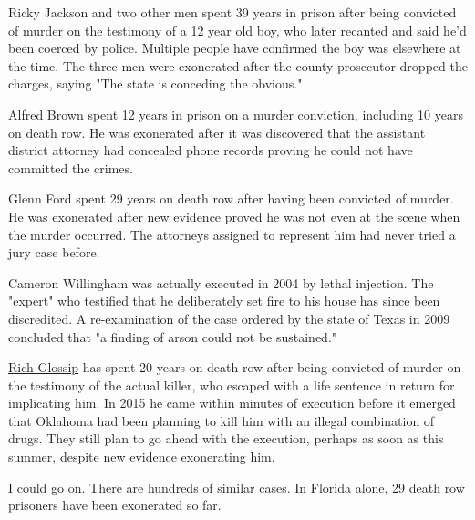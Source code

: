 Ricky
                  Jackson and two other men spent 39 years in prison after being
                  convicted of murder on the testimony of a 12 year old boy, who
                  later recanted and said he'd been coerced by police. Multiple
                  people have confirmed the boy was elsewhere at the time. The
                  three men were exonerated after the county prosecutor dropped
                  the charges, saying "The state is conceding the obvious."

Alfred
                  Brown spent 12 years in prison on a murder conviction,
                  including 10 years on death row. He was exonerated after it
                  was discovered that the assistant district attorney had
                  concealed phone records proving he could not have committed
                  the crimes.

Glenn Ford spent 29 years on death row
                  after having been convicted of murder. He was exonerated after
                  new evidence proved he was not even at the scene when the
                  murder occurred. The attorneys assigned to represent him had
                  never tried a jury case before.

Cameron Willingham
                  was actually executed in 2004 by lethal injection. The
                  "expert" who testified that he deliberately set fire to his
                  house has since been discredited. A re-examination of the case
                  ordered by the state of Texas in 2009 concluded that "a
                  finding of arson could not be sustained."

\href{https://saverichardglossip.com/facts}{\underline{Rich Glossip}}
                  has spent 20 years on death row after being convicted of
                  murder on the testimony of the actual killer, who escaped with
                  a life sentence in return for implicating him. In 2015 he came
                  within minutes of execution before it emerged that Oklahoma
                  had been planning to kill him with an illegal combination of
                  drugs. They still plan to go ahead with the execution, perhaps
                  as soon as this summer, despite
                  \href{https://www.usnews.com/news/best-states/oklahoma/articles/2020-10-14/attorney-for-oklahoma-death-row-inmate-claims-new-evidence}{\underline{new evidence}}
                  exonerating him.

I could go on. There are hundreds
                  of similar cases. In Florida alone, 29 death row prisoners
                  have been exonerated so far.

